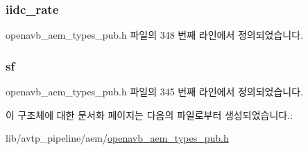 \subsubsection[{\texorpdfstring{iidc\+\_\+rate}{iidc_rate}}]{ iidc\+\_\+rate}\hypertarget{structopenavb__aem__stream__format__iidc__t_afe01b72c3b5ddc6660fc7f6a11b9c845}{}\label{structopenavb__aem__stream__format__iidc__t_afe01b72c3b5ddc6660fc7f6a11b9c845}


openavb\+\_\+aem\+\_\+types\+\_\+pub.\+h 파일의 348 번째 라인에서 정의되었습니다.

\subsubsection[{\texorpdfstring{sf}{sf}}]{ sf}\hypertarget{structopenavb__aem__stream__format__iidc__t_a153db177c2b7653917dff143e5f755e1}{}\label{structopenavb__aem__stream__format__iidc__t_a153db177c2b7653917dff143e5f755e1}


openavb\+\_\+aem\+\_\+types\+\_\+pub.\+h 파일의 345 번째 라인에서 정의되었습니다.



이 구조체에 대한 문서화 페이지는 다음의 파일로부터 생성되었습니다.\+:\begin{DoxyCompactItemize}
\item 
lib/avtp\+\_\+pipeline/aem/\hyperlink{openavb__aem__types__pub_8h}{openavb\+\_\+aem\+\_\+types\+\_\+pub.\+h}\end{DoxyCompactItemize}
